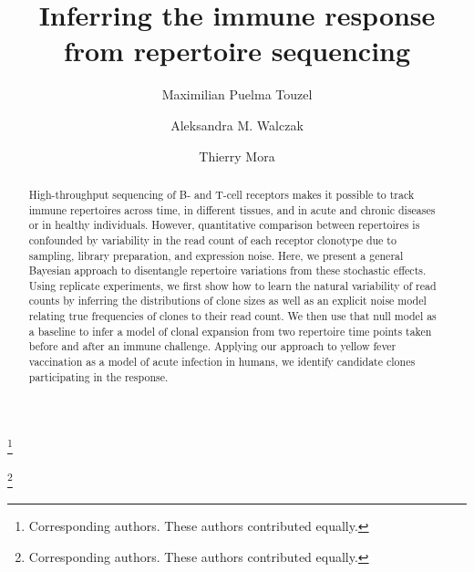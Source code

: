 \documentclass[pre,twocolumn,english,longbibliography]{revtex4}
\newcommand{\<}{\langle}
\renewcommand{\>}{\rangle}
\begin{document}
\title{Inferring the immune response from repertoire sequencing}

\author{Maximilian Puelma Touzel}


\author{Aleksandra M. Walczak}
\thanks{Corresponding authors. These authors contributed equally.}

\author{Thierry Mora}
\thanks{Corresponding authors. These authors contributed equally.}

\vspace{0.5cm}

\begin{abstract}
High-throughput sequencing of B- and T-cell receptors makes it possible to track immune repertoires across time, in different tissues, and in acute and chronic diseases or in healthy individuals. However, quantitative comparison between repertoires is confounded by variability in the read count of each receptor clonotype due to sampling, library preparation, and expression noise. Here, we present a general Bayesian approach to disentangle repertoire variations from these stochastic effects. Using replicate experiments, we first show how to learn the natural variability of read counts by inferring the distributions of clone sizes as well as an explicit noise model relating true frequencies of clones to their read count. We then use that null model as a baseline to infer a model of clonal expansion from two repertoire time points taken before and after an immune challenge. Applying our approach to yellow fever vaccination as a model of acute infection in humans, we identify candidate clones participating in the response.


\end{abstract}

\maketitle
\end{document}
